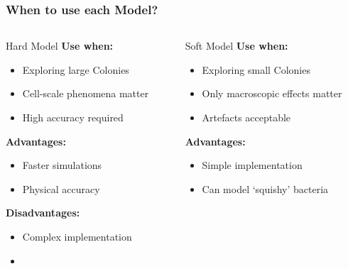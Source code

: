 \documentclass[10pt,t]{beamer}
\begin{document}
\begin{frame}
    \frametitle{When to use each Model?}

    \vspace{-0.55cm}

    \begin{columns}
        \begin{column}{0.5\textwidth}
            \begin{exampleblock}{Hard Model }
                \textbf{Use when:}
                \begin{itemize}
                    \item Exploring large Colonies
                    \item Cell-scale phenomena matter
                    \item High accuracy required
                \end{itemize}

                \textbf{Advantages:}
                \begin{itemize}
                    \item Faster simulations
                    \item Physical accuracy
                \end{itemize}

                \textbf{Disadvantages:}
                \begin{itemize}
                    \item Complex implementation
                    \item[]
                \end{itemize}
            \end{exampleblock}
        \end{column}

        \begin{column}{0.5\textwidth}
            \begin{alertblock}{Soft Model}
                \textbf{Use when:}
                \begin{itemize}
                    \item Exploring small Colonies
                    \item Only macroscopic effects matter
                    \item Artefacts acceptable
                \end{itemize}

                \textbf{Advantages:}
                \begin{itemize}
                    \item Simple implementation
                    \item Can model `squishy' bacteria
                \end{itemize}


\end{alertblock}
\end{column}
\end{columns}
\end{frame}
\end{document}
